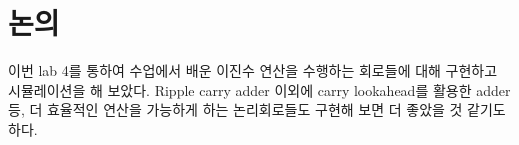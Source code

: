 \documentclass{scrartcl}
\begin{document}
\section{논의}
이번 lab 4를 통하여 수업에서 배운 이진수 연산을 수행하는 회로들에 대해 구현하고 시뮬레이션을 해 보았다.
Ripple carry adder 이외에 carry lookahead를 활용한 adder 등, 더 효율적인 연산을 가능하게 하는 논리회로들도 구현해 보면 더 좋았을 것 같기도 하다.
\end{document}
